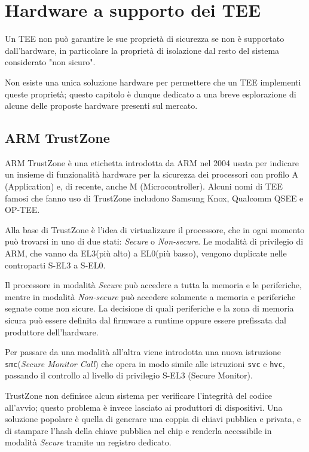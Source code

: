 \documentclass[12pt,italian]{report}
\begin{document}
\chapter{Hardware a supporto dei TEE}
\label{chap:hardware-supporto-tee}
Un TEE non può garantire le sue proprietà di sicurezza se non è supportato
dall'hardware, in particolare la proprietà di isolazione dal resto del
sistema considerato "non sicuro".

Non esiste una unica soluzione hardware per permettere che un TEE implementi
queste proprietà; questo capitolo è dunque dedicato a una breve
esplorazione di alcune delle proposte hardware presenti sul mercato.

\section{ARM TrustZone}
\label{sec:arm-trustzone}
ARM TrustZone\cite{trustzone} è una etichetta introdotta da ARM nel 2004
usata per indicare un insieme di funzionalità hardware per la
sicurezza dei processori con profilo A (Application) e, di recente,
anche M (Microcontroller).
Alcuni nomi di TEE famosi che fanno uso di TrustZone includono
Samsung Knox, Qualcomm QSEE e OP-TEE.

Alla base di TrustZone è l'idea di virtualizzare il processore, che in
ogni momento può trovarsi in uno di due stati:
\emph{Secure} o \emph{Non-secure}.
Le modalità di privilegio di ARM, che vanno da EL3(più alto)
a EL0(più basso), vengono duplicate nelle controparti S-EL3 a S-EL0.

Il processore in modalità \emph{Secure} può accedere a tutta la memoria
e le periferiche, mentre in modalità \emph{Non-secure} può accedere
solamente a memoria e periferiche segnate come non sicure.
La decisione di quali periferiche e la zona di memoria sicura può essere
definita dal firmware a runtime oppure essere prefissata dal produttore
dell'hardware.

Per passare da una modalità all'altra viene introdotta una nuova istruzione
\texttt{smc}(\textit{Secure Monitor Call}) che opera in modo simile alle
istruzioni \texttt{svc} e \texttt{hvc}, passando il controllo al livello
di privilegio S-EL3 (Secure Monitor).

\medbreak \noindent

TrustZone non definisce alcun sistema per verificare l'integrità del codice
all'avvio; questo problema è invece lasciato ai produttori di dispositivi.
Una soluzione popolare è quella di generare una coppia di chiavi pubblica
e privata, e di stampare l'hash della chiave pubblica nel chip e renderla
accessibile in modalità \emph{Secure} tramite un registro dedicato.
\end{document}
